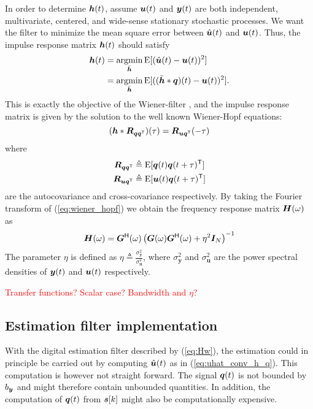 In order to determine $\bm{h}(t)$, assume $\bm{u}(t)$ and $\bm{y}(t)$ are both independent, multivariate, centered, and wide-sense stationary stochastic processes. We want the filter to minimize the mean square error between $\hat{\bm{u}}(t)$ and $\bm{u}(t)$. Thus, the impulse response matrix $\bm{h}(t)$ should satisfy
\begin{align}
    \bm{h}(t)    & = \operatorname*{argmin}_{\bar{\bm{h}}} \text{E}[(\hat{\bm{u}}(t) - \bm{u}(t))^2] \\
            & = \operatorname*{argmin}_{\bar{\bm{h}}} \text{E}[((\bar{\bm{h}}*\bm{q})(t) - \bm{u}(t))^2].
\end{align}
This is exactly the objective of the Wiener-filter \cite{optimal_filtering}, and the impulse response matrix is given by the solution to the well known Wiener-Hopf equations:
\begin{equation}
    \label{eq:wiener_hopf}
    (\bm{h}* \bm{R}_{\bm{q}\bm{q}^\mathsf{T}})(\tau) = \bm{R}_{\bm{u}\bm{q}^\mathsf{T}}(-\tau)
\end{equation}
where
\begin{align}
    \bm{R}_{\bm{q}\bm{q}^\mathsf{T}} & \triangleq \text{E}[\bm{q}(t)\bm{q}(t+\tau)^\mathsf{T}] \\
    \bm{R}_{\bm{u}\bm{q}^\mathsf{T}} & \triangleq \text{E}[\bm{u}(t)\bm{q}(t+\tau)^\mathsf{T}]
\end{align}
are the autocovariance and cross-covariance respectively. By taking the Fourier transform of (\ref{eq:wiener_hopf}) we obtain the frequency response matrix $\bm{H}(\omega)$ as
\begin{equation}
    \label{eq:Hw}
    \bm{H}(\omega) = \bm{G}^\mathsf{H}(\omega) \left( \bm{G}(\omega)\bm{G}^\mathsf{H}(\omega) + \eta^2\bm{I}_N \right)^{-1}
\end{equation}
The parameter $\eta$ is defined as $\eta \triangleq \frac{\sigma_{\bm{y}}^2}{\sigma_{\bm{u}}^2}$, where $\sigma_{\bm{y}}^2$ and $\sigma_{\bm{u}}^2$ are the power spectral densities of $\bm{y}(t)$ and $\bm{u}(t)$ respectively.


\textcolor{red}{Transfer functions? Scalar case? Bandwidth and $\eta$?}


\subsection{Estimation filter implementation}
With the digital estimation filter described by (\ref{eq:Hw}), the estimation could in principle be carried out by computing $\hat{\bm{u}}(t)$ as in (\ref{eq:uhat_conv_h_q}). This computation is however not straight forward. The signal $\bm{q}(t)$ is not bounded by $b_{\bm{y}}$ and might therefore contain unbounded quantities. In addition, the computation of $\bm{q}(t)$ from $\bm{s}[k]$ might also be computationally expensive.

